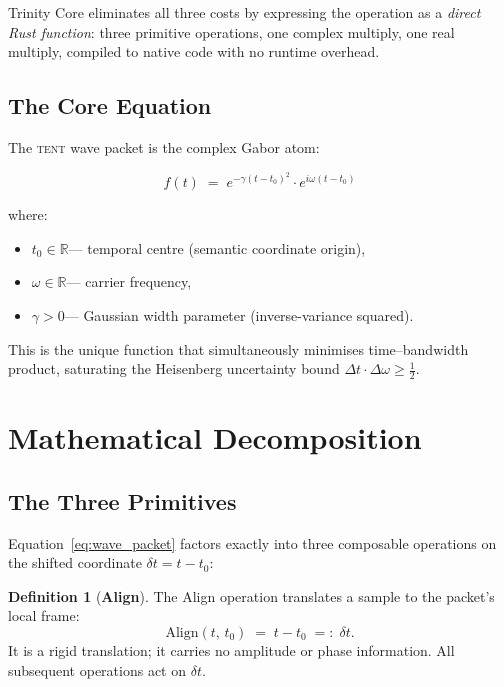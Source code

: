 \documentclass[11pt,a4paper]{article}
\theoremstyle{definition}
\newtheorem{definition}[theorem]{Definition}
\newcommand{\TENT}{\textsc{tent}}
\begin{document}
Trinity Core eliminates all three costs by expressing the operation as a
\emph{direct Rust function}: three primitive operations, one complex
multiply, one real multiply, compiled to native code with no runtime
overhead.

\subsection{The Core Equation}

The \TENT{} wave packet is the complex Gabor atom:

\begin{equation}
  \boxed{f(t) \;=\; e^{-\gamma(t - t_0)^2} \cdot e^{i\omega(t - t_0)}}
  \label{eq:wave_packet}
\end{equation}

where:
\begin{itemize}
  \item $t_0 \in \mathbb{R}$\quad --- temporal centre (semantic coordinate origin),
  \item $\omega \in \mathbb{R}$\quad --- carrier frequency,
  \item $\gamma > 0$\quad --- Gaussian width parameter (inverse-variance squared).
\end{itemize}

This is the unique function that simultaneously minimises
time--bandwidth product, saturating the Heisenberg uncertainty bound
$\Delta t \cdot \Delta\omega \geq \tfrac{1}{2}$.

\section{Mathematical Decomposition}
\label{sec:math}

\subsection{The Three Primitives}

Equation~\eqref{eq:wave_packet} factors exactly into three composable
operations on the shifted coordinate $\delta t = t - t_0$:

\begin{definition}[\textbf{Align}]
  \label{def:align}
  The Align operation translates a sample to the packet's local frame:
  \begin{equation}
    \mathrm{Align}(t,\, t_0) \;=\; t - t_0 \;=:\; \delta t.
    \label{eq:align}
  \end{equation}
  It is a rigid translation; it carries no amplitude or phase
  information. All subsequent operations act on $\delta t$.
\end{definition}
\end{document}

